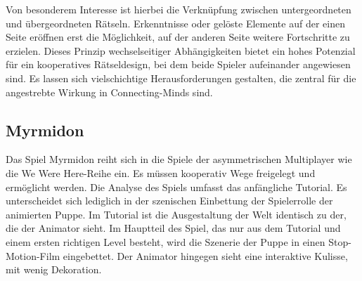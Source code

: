 Von besonderem Interesse ist hierbei die Verknüpfung zwischen untergeordneten und übergeordneten Rätseln. Erkenntnisse oder gelöste Elemente auf der einen Seite eröffnen erst die Möglichkeit, auf der anderen Seite weitere Fortschritte zu erzielen. Dieses Prinzip wechselseitiger Abhängigkeiten bietet ein hohes Potenzial für ein kooperatives Rätseldesign, bei dem beide Spieler aufeinander angewiesen sind. Es lassen sich vielschichtige Herausforderungen gestalten, die zentral für die angestrebte Wirkung in Connecting-Minds sind.

\subsection{Myrmidon}
Das Spiel Myrmidon reiht sich in die Spiele der asymmetrischen Multiplayer wie die We Were Here-Reihe ein. Es müssen kooperativ Wege freigelegt und ermöglicht werden. Die Analyse des Spiels umfasst das anfängliche Tutorial. Es unterscheidet sich lediglich in der szenischen Einbettung der Spielerrolle der animierten Puppe. Im Tutorial ist die Ausgestaltung der Welt identisch zu der, die der Animator sieht. Im Hauptteil des Spiel, das nur aus dem Tutorial und einem ersten richtigen Level besteht, wird die Szenerie der Puppe in einen Stop-Motion-Film eingebettet. Der Animator hingegen sieht eine interaktive Kulisse, mit wenig Dekoration.

